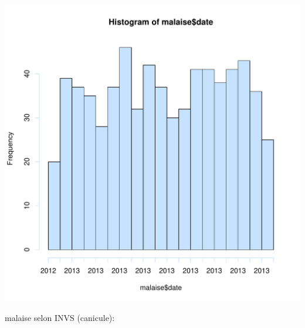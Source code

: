 \documentclass[12pt,english,french,twoside]{book}\usepackage[]{graphicx}\usepackage[]{color}
\makeatletter
\def\maxwidth{ %
  \ifdim\Gin@nat@width>\linewidth
    \linewidth
  \else
    \Gin@nat@width
  \fi
}
\newenvironment{knitrout}{}{} %
\makeatother
\begin{document}
\begin{knitrout}
\color{fgcolor}
\includegraphics[width=\maxwidth]{figure/malaises} 

\end{knitrout}


malaise selon INVS (canicule):
\end{document}
